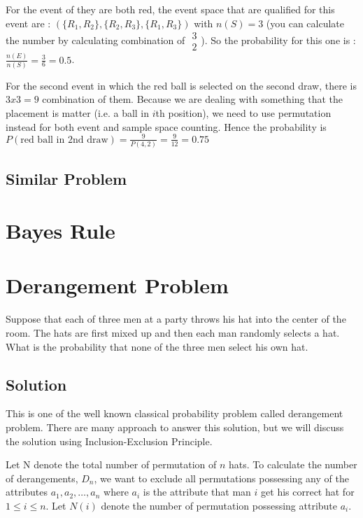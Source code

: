 \documentclass[12pt,a4paper]{article}
\begin{document}
For the event of they are both red, the event space that are qualified for this event are : $(\{R_1, R_2\}, \{R_2, R_3\},\{R_1, R_3\})$ with $n(S) = 3$ (you can calculate the number by calculating combination of $\begin{array}{c}3\\2\end{array}$). So the probability for this one is : $\frac{n(E)}{n(S)} = \frac{3}{6} = 0.5$.

For the second event in which the red ball is selected on the second draw, there is $3x3=9$ combination of them. Because we are dealing with something that the placement is matter (i.e. a ball in $i$th position), we need to use permutation instead for both event and sample space counting. Hence the probability is $P(\text{red ball in 2nd draw}) = \frac{9}{P(4,2)} = \frac{9}{12} = 0.75$


\subsection{Similar Problem}

\section{Bayes Rule}


\section{Derangement Problem}

Suppose that each of three men at a party throws his hat into the center of the room. The hats are first mixed up and then each man randomly selects a hat. What is the probability that none of the three men select his own hat.

\subsection{Solution}

This is one of the well known classical probability problem called derangement problem. There are many approach to answer this solution, but we will discuss the solution using Inclusion-Exclusion Principle.

Let N denote the total number of permutation of $n$ hats. To calculate the number of derangements, $D_n$, we want to exclude all permutations possessing any of the attributes $a_1, a_2, \dots, a_n$ where $a_i$ is the attribute that man $i$ get his correct hat for $1 \leq i \leq n$. Let $N(i)$ denote the number of permutation possessing attribute $a_i$.
\end{document}
